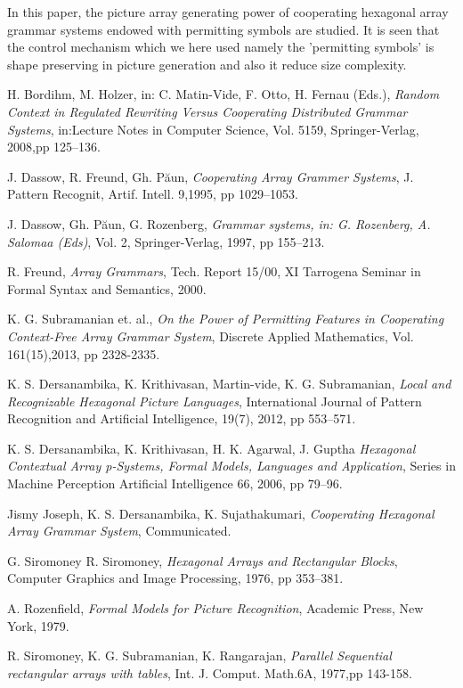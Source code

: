 \documentclass[11pt]{article}
\begin{document}
 In this paper, the picture array
generating power of cooperating  hexagonal array grammar
systems endowed with permitting symbols are studied. It is seen
that the control mechanism which we here used namely the
'permitting symbols' is shape preserving in picture generation and
also it reduce size complexity.

 \begin{thebibliography}{99}

 H. Bordihm, M. Holzer, in: C. Matin-Vide, F. Otto, H. Fernau (Eds.), \textit{Random Context in Regulated Rewriting Versus Cooperating Distributed Grammar Systems}, in:Lecture Notes in Computer Science, Vol. 5159, Springer-Verlag, 2008,pp 125--136.

J. Dassow, R. Freund, Gh. P\u aun, \textit{Cooperating Array Grammer Systems}, J. Pattern Recognit, Artif. Intell. 9,1995, pp 1029--1053.

J. Dassow, Gh. P\u aun, G. Rozenberg, \textit{Grammar systems, in: G. Rozenberg, A. Salomaa (Eds)}, Vol. 2, Springer-Verlag, 1997, pp 155--213.

R. Freund, \textit{Array Grammars}, Tech. Report 15/00, XI Tarrogena Seminar in Formal Syntax and Semantics, 2000.

K. G. Subramanian et. al., \textit{On the Power of Permitting Features in Cooperating Context-Free Array Grammar
System}, Discrete Applied Mathematics, Vol. 161(15),2013, pp
2328-2335.

K. S. Dersanambika, K. Krithivasan, Martin-vide, K. G. Subramanian, \textit{Local and Recognizable Hexagonal Picture Languages}, International Journal of Pattern Recognition and Artificial Intelligence, 19(7), 2012, pp 553--571.

K. S. Dersanambika, K. Krithivasan, H. K. Agarwal, J. Guptha \textit{Hexagonal Contextual Array p-Systems, Formal Models, Languages and Application}, Series in Machine Perception Artificial Intelligence 66, 2006, pp 79--96.

Jismy Joseph, K. S. Dersanambika, K. Sujathakumari, \textit{Cooperating Hexagonal Array Grammar System}, Communicated.

G. Siromoney R. Siromoney, \textit{Hexagonal Arrays and Rectangular Blocks}, Computer Graphics and Image Processing, 1976, pp 353--381.

A. Rozenfield, \textit{Formal Models for Picture Recognition}, Academic Press, New York, 1979.

 R. Siromoney, K. G. Subramanian, K. Rangarajan,
\textit{Parallel  Sequential rectangular arrays with
tables}, Int. J. Comput. Math.6A, 1977,pp 143-158.

\end{thebibliography}
\end{document}
